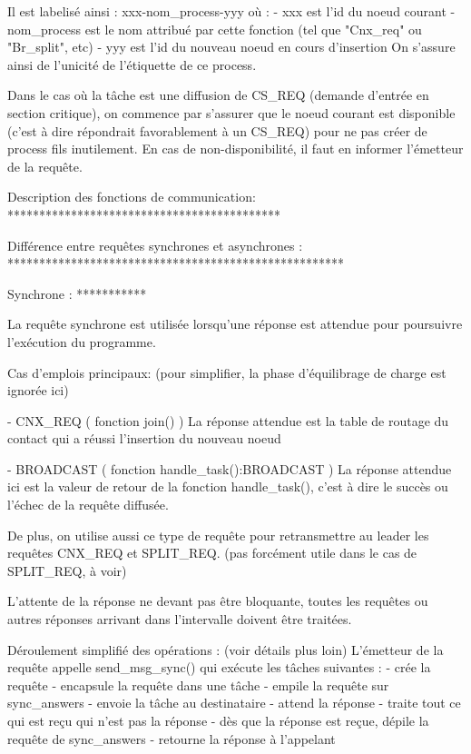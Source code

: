 Il est labelisé ainsi : xxx-nom_process-yyy où :
  - xxx est l'id du noeud courant
  - nom_process est le nom attribué par cette fonction (tel que "Cnx_req" ou "Br_split", etc)
  - yyy est l'id du nouveau noeud en cours d'insertion
On s'assure ainsi de l'unicité de l'étiquette de ce process.

Dans le cas où la tâche est une diffusion de CS_REQ (demande d'entrée en section critique), on
commence par s'assurer que le noeud courant est disponible (c'est à dire répondrait favorablement à
un CS_REQ) pour ne pas créer de process fils inutilement. En cas de non-disponibilité, il faut en
informer l'émetteur de la requête.

Description des fonctions de communication:
*******************************************

Différence entre requêtes synchrones et asynchrones :
*****************************************************

Synchrone :
***********

La requête synchrone est utilisée lorsqu'une réponse est attendue pour poursuivre l'exécution du
programme.

Cas d'emplois principaux:
(pour simplifier, la phase d'équilibrage de charge est ignorée ici)

- CNX_REQ ( fonction join() )
  La réponse attendue est la table de routage du contact qui a réussi l'insertion du nouveau noeud

- BROADCAST ( fonction handle_task():BROADCAST )
  La réponse attendue ici est la valeur de retour de la fonction handle_task(), c'est à dire le succès
  ou l'échec de la requête diffusée.

De plus, on utilise aussi ce type de requête pour retransmettre au leader les requêtes CNX_REQ et
SPLIT_REQ. (pas forcément utile dans le cas de SPLIT_REQ, à voir)

L'attente de la réponse ne devant pas être bloquante, toutes les requêtes ou autres réponses
arrivant dans l'intervalle doivent être traitées.

Déroulement simplifié des opérations : (voir détails plus loin)
L'émetteur de la requête appelle send_msg_sync() qui exécute les tâches suivantes :
- crée la requête
- encapsule la requête dans une tâche
- empile la requête sur sync_answers
- envoie la tâche au destinataire
- attend la réponse
- traite tout ce qui est reçu qui n'est pas la réponse
- dès que la réponse est reçue, dépile la requête de sync_answers
- retourne la réponse à l'appelant


